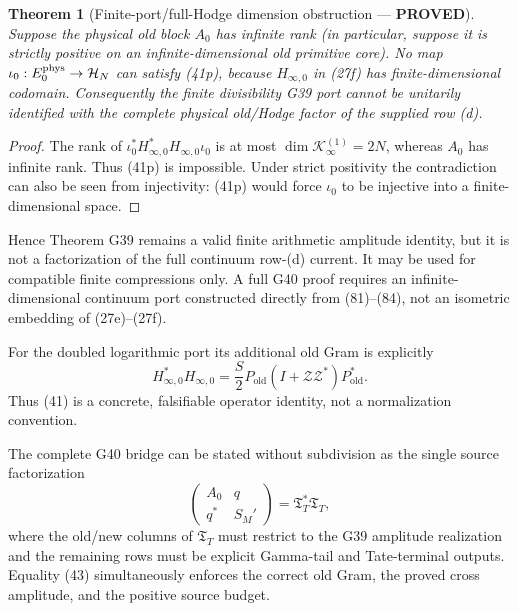 \documentclass[11pt]{article}
\newtheorem{theorem}{Theorem}
\newcommand{\PROVED}{\textcolor{green!45!black}{\textbf{PROVED}}}
\newcommand{\old}{\mathrm{old}}
\newcommand{\cZ}{\mathscr Z}
\begin{document}
\begin{theorem}[Finite-port/full-Hodge dimension obstruction --- \PROVED]
Suppose the physical old block $A_0$ has infinite rank (in particular, suppose
it is strictly positive on an infinite-dimensional old primitive core).  No
map $\iota_0:E_0^{\rm phys}\to\mathcal H_N$ can satisfy (41p), because
$H_{\infty,0}$ in (27f) has finite-dimensional codomain.  Consequently the
finite divisibility G39 port cannot be unitarily identified with the complete
physical old/Hodge factor of the supplied row (d).
\end{theorem}

\begin{proof}
The rank of
$\iota_0^*H_{\infty,0}^*H_{\infty,0}\iota_0$ is at most
$\dim\mathcal K_\infty^{(1)}=2N$, whereas $A_0$ has infinite rank.  Thus
(41p) is impossible.  Under strict positivity the contradiction can also be
seen from injectivity: (41p) would force $\iota_0$ to be injective into a
finite-dimensional space.
\end{proof}

Hence Theorem G39 remains a valid finite arithmetic amplitude identity, but
it is not a factorization of the full continuum row-(d) current.  It may be
used for compatible finite compressions only.  A full G40 proof requires an
infinite-dimensional continuum port constructed directly from (81)--(84),
not an isometric embedding of (27e)--(27f).

For the doubled logarithmic port its additional old Gram is explicitly
\begin{equation}
 H_{\infty,0}^*H_{\infty,0}
 =\frac S2P_{\old}(I+\cZ\cZ^*)P_{\old}^*.               \tag{42}
\end{equation}
Thus (41) is a concrete, falsifiable operator identity, not a normalization
convention.

The complete G40 bridge can be stated without subdivision as the single
source factorization
\begin{equation}
 \boxed{
 \begin{pmatrix}A_0&q\\q^*&S_M'\end{pmatrix}
 =\mathfrak T_T^*\mathfrak T_T,}                        \tag{43}
\end{equation}
where the old/new columns of $\mathfrak T_T$ must restrict to the G39
amplitude realization and the remaining rows must be explicit Gamma-tail and
Tate-terminal outputs.  Equality (43) simultaneously enforces the correct old
Gram, the proved cross amplitude, and the positive source budget.
\end{document}

